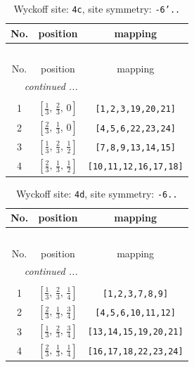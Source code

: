 \documentclass[fleqn,8pt]{jsarticle}
\begin{document}
\renewcommand{\arraystretch}{1.2}
\begin{longtable}{ccc}
\caption{Wyckoff site: {\tt 4c}, site symmetry: {\tt -6'..}}
 \\
 \hline \hline
No. & position & mapping \\ \hline \endfirsthead

\multicolumn{2}{l}{\tablename\ \thetable{}} \\
 \hline \hline
No. & position & mapping \\ \hline \endhead

 \hline \hline
\multicolumn{2}{r}{\footnotesize\it continued ...} \\ \endfoot

 \hline \hline
\multicolumn{2}{r}{} \\ \endlastfoot

1 & $\left[ \frac{1}{3},\, \frac{2}{3},\, 0 \right]$ & {\tt [1,2,3,19,20,21]} \\ \hline
2 & $\left[ \frac{2}{3},\, \frac{1}{3},\, 0 \right]$ & {\tt [4,5,6,22,23,24]} \\ \hline
3 & $\left[ \frac{1}{3},\, \frac{2}{3},\, \frac{1}{2} \right]$ & {\tt [7,8,9,13,14,15]} \\ \hline
4 & $\left[ \frac{2}{3},\, \frac{1}{3},\, \frac{1}{2} \right]$ & {\tt [10,11,12,16,17,18]} \\
\end{longtable}
\renewcommand{\arraystretch}{1.2}
\begin{longtable}{ccc}
\caption{Wyckoff site: {\tt 4d}, site symmetry: {\tt -6..}}
 \\
 \hline \hline
No. & position & mapping \\ \hline \endfirsthead

\multicolumn{2}{l}{\tablename\ \thetable{}} \\
 \hline \hline
No. & position & mapping \\ \hline \endhead

 \hline \hline
\multicolumn{2}{r}{\footnotesize\it continued ...} \\ \endfoot

 \hline \hline
\multicolumn{2}{r}{} \\ \endlastfoot

1 & $\left[ \frac{1}{3},\, \frac{2}{3},\, \frac{1}{4} \right]$ & {\tt [1,2,3,7,8,9]} \\ \hline
2 & $\left[ \frac{2}{3},\, \frac{1}{3},\, \frac{3}{4} \right]$ & {\tt [4,5,6,10,11,12]} \\ \hline
3 & $\left[ \frac{1}{3},\, \frac{2}{3},\, \frac{3}{4} \right]$ & {\tt [13,14,15,19,20,21]} \\ \hline
4 & $\left[ \frac{2}{3},\, \frac{1}{3},\, \frac{1}{4} \right]$ & {\tt [16,17,18,22,23,24]} \\
\end{longtable}
\end{document}
